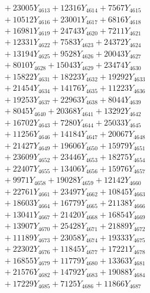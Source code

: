 \documentclass[a4paper,10pt]{article}
\begin{document}
{\begin{align}
&\;  + 23005 Y_{4613} + 12316 Y_{4614} + 7567 Y_{4615} \\[0.3ex]
&\;  + 10512 Y_{4616} + 23001 Y_{4617} + 6816 Y_{4618} \\[0.5ex]\allowbreak
&\;  + 16981 Y_{4619} + 24743 Y_{4620} + 7211 Y_{4621} \\[0.3ex]
&\;  + 12331 Y_{4622} + 7583 Y_{4623} + 24372 Y_{4624} \\[0.3ex]
&\;  + 13194 Y_{4625} + 9528 Y_{4626} + 20043 Y_{4627} \\[0.3ex]
&\;  + 8010 Y_{4628} + 15043 Y_{4629} + 23474 Y_{4630} \\[0.3ex]
&\;  + 15822 Y_{4631} + 18223 Y_{4632} + 19292 Y_{4633} \\[0.3ex]
&\;  + 21454 Y_{4634} + 14176 Y_{4635} + 11223 Y_{4636} \\[0.3ex]
&\;  + 19253 Y_{4637} + 22963 Y_{4638} + 8044 Y_{4639} \\[0.3ex]
&\;  + 8045 Y_{4640} + 20368 Y_{4641} + 13292 Y_{4642} \\[0.3ex]
&\;  + 16702 Y_{4643} + 7280 Y_{4644} + 25033 Y_{4645} \\[0.3ex]
&\;  + 11256 Y_{4646} + 14184 Y_{4647} + 20067 Y_{4648} \\[0.5ex]\allowbreak
&\;  + 21427 Y_{4649} + 19606 Y_{4650} + 15979 Y_{4651} \\[0.3ex]
&\;  + 23609 Y_{4652} + 23446 Y_{4653} + 18275 Y_{4654} \\[0.3ex]
&\;  + 22407 Y_{4655} + 13406 Y_{4656} + 15976 Y_{4657} \\[0.3ex]
&\;  + 9971 Y_{4658} + 19028 Y_{4659} + 12142 Y_{4660} \\[0.3ex]
&\;  + 22761 Y_{4661} + 23497 Y_{4662} + 10845 Y_{4663} \\[0.3ex]
&\;  + 18603 Y_{4664} + 16779 Y_{4665} + 21138 Y_{4666} \\[0.3ex]
&\;  + 13041 Y_{4667} + 21420 Y_{4668} + 16854 Y_{4669} \\[0.3ex]
&\;  + 13907 Y_{4670} + 25428 Y_{4671} + 21889 Y_{4672} \\[0.3ex]
&\;  + 11189 Y_{4673} + 23058 Y_{4674} + 19333 Y_{4675} \\[0.3ex]
&\;  + 22302 Y_{4676} + 11845 Y_{4677} + 17221 Y_{4678} \\[0.5ex]\allowbreak
&\;  + 16855 Y_{4679} + 11779 Y_{4680} + 13363 Y_{4681} \\[0.3ex]
&\;  + 21576 Y_{4682} + 14792 Y_{4683} + 19088 Y_{4684} \\[0.3ex]
&\;  + 17229 Y_{4685} + 7125 Y_{4686} + 11866 Y_{4687} \\[0.3ex]

\end{align}}
\end{document}
